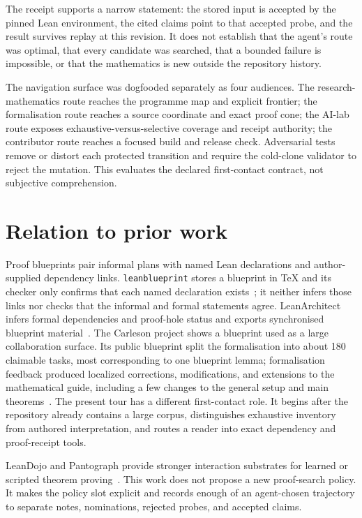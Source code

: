 \documentclass[11pt]{article}
\begin{document}
The receipt supports a narrow statement: the stored input is accepted by the
pinned Lean environment, the cited claims point to that accepted probe, and
the result survives replay at this revision. It does not establish that the
agent's route was optimal, that every candidate was searched, that a bounded
failure is impossible, or that the mathematics is new outside the repository
history.

The navigation surface was dogfooded separately as four audiences. The
research-mathematics route reaches the programme map and explicit frontier;
the formalisation route reaches a source coordinate and exact proof cone; the
AI-lab route exposes exhaustive-versus-selective coverage and receipt
authority; the contributor route reaches a focused build and release check.
Adversarial tests remove or distort each protected transition and require the
cold-clone validator to reject the mutation. This evaluates the declared
first-contact contract, not subjective comprehension.

\section{Relation to prior work}\label{sec:related}

Proof blueprints pair informal plans with named Lean declarations and
author-supplied dependency links.  \texttt{leanblueprint} stores a blueprint
in \TeX{} and its checker only confirms that each named declaration
exists~\cite{leanblueprint}; it neither infers those links nor checks that the
informal and formal statements agree.  LeanArchitect infers formal
dependencies and proof-hole status and exports synchronised blueprint
material~\cite{leanarchitect}. The Carleson project shows a blueprint used as
a large collaboration surface. Its public blueprint split the formalisation
into about 180 claimable tasks, most corresponding to one blueprint lemma;
formalisation feedback produced localized corrections, modifications, and
extensions to the mathematical guide, including a few changes to the general
setup and main theorems~\cite{carleson}. The present tour has a different first-contact role. It
begins after the repository already contains a large corpus, distinguishes
exhaustive inventory from authored interpretation, and routes a reader into
exact dependency and proof-receipt tools.

LeanDojo and Pantograph provide stronger interaction substrates for learned or
scripted theorem proving~\cite{leandojo,pantograph}. This work does not propose
a new proof-search policy. It makes the policy slot explicit and records enough
of an agent-chosen trajectory to separate notes, nominations, rejected probes,
and accepted claims.
\end{document}
